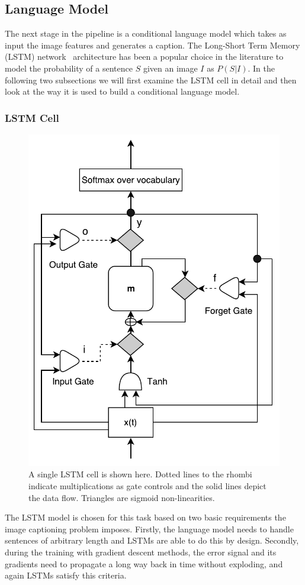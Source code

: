 \subsection{Language Model}

The next stage in the pipeline is a conditional language model which
takes as input the image features and generates a caption. 
The Long-Short Term Memory (LSTM) network~\cite{Hochreiter1997} architecture has
been a popular choice in the literature to model the probability of a sentence
$S$ given an image $I$ as $P(S|I)$.
In the following two subsections we will first examine the LSTM cell in detail and
then look at the way it is used to build a conditional language model.

\subsubsection{LSTM Cell}

\begin{figure}[h]
  \begin{center}
    \includegraphics[width=0.5\linewidth]{images/LstmBlockDiag.pdf}
  \end{center}
  \vspace*{-6mm}
  \caption{A single LSTM cell is shown here. Dotted lines
    to the rhombi indicate multiplications as gate controls and the
    solid lines depict the data flow. Triangles are sigmoid
    non-linearities.}
  \label{fig:lstmcell}
\end{figure}

The LSTM model is chosen for this task based on two basic requirements the image
captioning problem imposes. 
Firstly, the language model needs to handle sentences of arbitrary length and
LSTMs are able to do this by design.
Secondly, during the training with gradient descent methods, the error signal
and its gradients need to propagate a long way back in time without exploding,
and again LSTMs satisfy this criteria.


